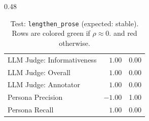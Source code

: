 \begin{table}[htbp]
\begin{subtable}[t]{0.48\textwidth}
\begin{tabular}{lrr}
\rowcolor{matchFalse} LLM Judge: Informativeness            &   $1.00$ &  0.00 \\
\rowcolor{matchFalse} LLM Judge: Overall                    &   $1.00$ &  0.00 \\
\rowcolor{matchFalse} LLM Judge: Annotator        &   $1.00$ &  0.00 \\
\rowcolor{matchFalse} Persona Precision                     &  $-1.00$ &  1.00 \\
\rowcolor{matchFalse} Persona Recall                        &   $1.00$ &  0.00 \\
\bottomrule
\end{tabular}
\caption{LLM metrics}
\end{subtable}
\caption[Test: \texttt{lengthen\_prose} (expected: stable).]{Test: \texttt{lengthen\_prose} (expected: stable). Rows are colored green if $\rho\approx0$. and red otherwise.}
\label{tab:lengthen_prose}
\end{table}


